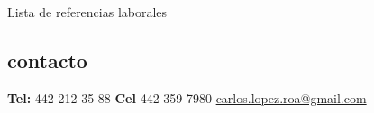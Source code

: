 \documentclass[]{friggeri-cv}
\begin{document}
       {Lista de referencias laborales}


\begin{aside}
  \section{contacto}
    \textbf{Tel: } 442-212-35-88
    \textbf{Cel } 442-359-7980
    \href{mailto:carlos.lopez.roa@gmail.com}{carlos.lopez.roa@gmail.com}
\end{aside}
\end{document}
